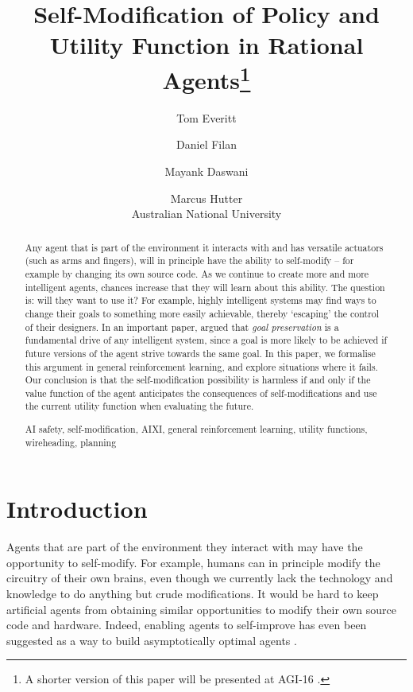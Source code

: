 \documentclass[a4paper]{article}
\title{\vspace{-0.5cm}Self-Modification of Policy and Utility Function in Rational Agents\footnote{%
A shorter version of this paper will be presented at AGI-16 \citep{Everitt2016sm}.}}
\author{Tom Everitt\and Daniel Filan\and
Mayank Daswani\and Marcus Hutter\\
Australian National University}
\date{}
\theoremstyle{definition}
\theoremstyle{remark}
\newenvironment{keywords}%
{\renewcommand{\abstractname}{Keywords}\begin{abstract}\noindent}%
{\end{abstract}}
\begin{document}
\maketitle
\vspace{-0.5cm}

\begin{abstract}
  Any agent that is part of the environment it interacts with and
  has versatile actuators (such as arms and fingers),
  will in principle have the ability to self-modify -- for example by
  changing its own source code.
  As we continue to create more and more intelligent agents,
  chances increase that they will learn about this ability.
  The question is: will they want to use it?
  For example, highly intelligent systems may find ways to
  change their goals to something more easily achievable,
  thereby `escaping' the control of their designers.
  In an important paper, \citet{Omohundro2008} argued that
  \emph{goal preservation} is a fundamental drive of any
  intelligent system, since a goal is more
  likely to be achieved if future versions of the
  agent strive towards the same goal.
  In this paper, we formalise this argument in
  general reinforcement learning, and explore
  situations where it fails.
  Our conclusion is that the self-modification possibility is harmless
  if and only if the value function of the agent
  anticipates the consequences of self-modifications and
  use the current utility function when evaluating the future.
\end{abstract}


\begin{keywords}%
  AI safety, self-modification, AIXI, general reinforcement learning, utility functions,
  wireheading, planning
\end{keywords}

\tableofcontents

\sloppy


\section{Introduction}

Agents that are part of the environment they interact with
may have the opportunity to self-modify.
For example, humans can in principle modify the circuitry
of their own brains, even though we currently lack the
technology and knowledge to do anything but crude modifications.
It would be hard to keep artificial agents
from obtaining similar opportunities to modify their
own source code and hardware.
Indeed, enabling agents to self-improve has even been suggested
as a way to build asymptotically optimal agents \citep{Schmidhuber2007}.
\end{document}
